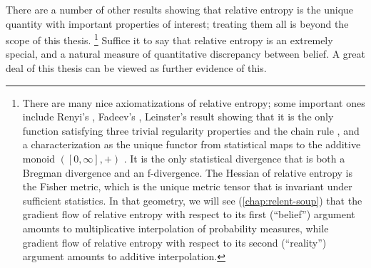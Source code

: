 There are a number of other results showing that relative entropy is the unique quantity with important properties of interest; treating them all is beyond the scope of this thesis.%
\footnote{%
    There are many nice axiomatizations of relative entropy;
    some important ones include Renyi's \citep{renyi1961measures}, Fadeev's \citep{fadeev1957begriff}, Leinster's result showing
    that it is the only function satisfying three trivial regularity
    properties and the chain rule \citep{leinster2017shortcharacterizationrelativeentropy}, and a characterization as the unique functor from statistical maps to the additive monoid $([0,\infty],+)$ \citep{baez2014bayesiancharacterizationrelativeentropy}.
    It is the only statistical divergence that is both a Bregman divergence and an f-divergence. 
    The Hessian of relative entropy is the Fisher metric, which is the unique metric tensor that is invariant under sufficient statistics. 
    In that geometry, we will see (\cref{chap:relent-soup}) that the gradient flow of relative entropy with respect to its first (``belief'') argument amounts to multiplicative interpolation of probability measures, while gradient flow of relative entropy with respect to its second (``reality'') argument amounts to additive interpolation. 
}
%
Suffice it to say that relative entropy is an extremely special,
    and a natural measure of quantitative discrepancy between belief. 
A great deal of this thesis can be viewed as further evidence of this. 
    
%

